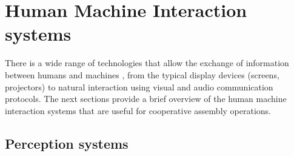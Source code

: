 


\section{Human Machine Interaction systems}

There is a wide range of technologies that allow the exchange of information between humans and machines \cite{Goodrich2008}, from the typical display devices (screens, projectors) to natural interaction using visual and audio \cite{Yan2014} communication protocols. The next sections provide a brief overview of the human machine interaction systems that are useful for cooperative assembly operations.



\subsection{Perception systems}

